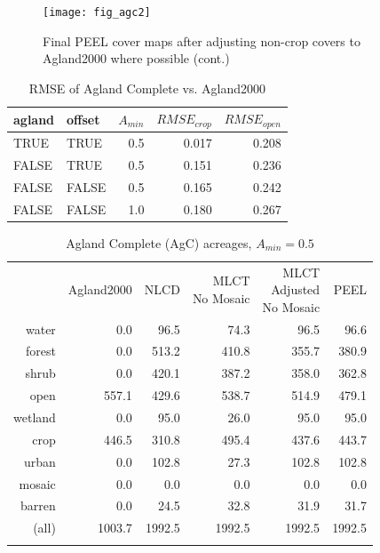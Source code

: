 \begin{figure}[hpt] 
  \centering


\texttt{[image: fig\_agc2]}
\caption{Final PEEL cover maps after adjusting non-crop covers to Agland2000 where possible (cont.)} 
\label{fig:agc2} 
\end{figure} 




\begin{table}[ht]
\begin{center}
\begin{tabular}{llrrr}
  \hline
agland & offset & $A_{min}$ & $RMSE_{crop}$ & $RMSE_{open}$ \\ 
  \hline
TRUE & TRUE & 0.5 & 0.017 & 0.208 \\ 
  FALSE & TRUE & 0.5 & 0.151 & 0.236 \\ 
  FALSE & FALSE & 0.5 & 0.165 & 0.242 \\ 
  FALSE & FALSE & 1.0 & 0.180 & 0.267 \\ 
   \hline
\end{tabular}
\caption{RMSE of Agland Complete vs. Agland2000}
\label{tab:rmse3}
\end{center}
\end{table}
\begin{table}[ht]
\begin{center}
{\small
\begin{tabular}{rrrrrr}
  \hline
 & Agland2000 & NLCD & \pbox[c][][c]{3in}{MLCT\\No Mosaic} & \pbox[c][][c]{3in}{\smallskip{}MLCT\\Adjusted\\No Mosaic} & PEEL \\ 
  \noalign{\smallskip} \hline
water & 0.0 & 96.5 & 74.3 & 96.5 & 96.6 \\ 
  forest & 0.0 & 513.2 & 410.8 & 355.7 & 380.9 \\ 
  shrub & 0.0 & 420.1 & 387.2 & 358.0 & 362.8 \\ 
  open & 557.1 & 429.6 & 538.7 & 514.9 & 479.1 \\ 
  wetland & 0.0 & 95.0 & 26.0 & 95.0 & 95.0 \\ 
  crop & 446.5 & 310.8 & 495.4 & 437.6 & 443.7 \\ 
  urban & 0.0 & 102.8 & 27.3 & 102.8 & 102.8 \\ 
  mosaic & 0.0 & 0.0 & 0.0 & 0.0 & 0.0 \\ 
  barren & 0.0 & 24.5 & 32.8 & 31.9 & 31.7 \\ 
  (all) & 1003.7 & 1992.5 & 1992.5 & 1992.5 & 1992.5 \\ 
   \noalign{\smallskip} \hline
\end{tabular}
}
\caption{Agland Complete (AgC) acreages, $A_{min}=0.5$}
\label{tab:areas3}
\end{center}
\end{table}
 
